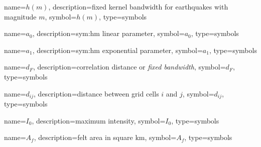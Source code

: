 {
	name={\ensuremath{h(m)}},
	description={fixed kernel bandwidth for earthquakes with magnitude $m$}, 
	symbol={\ensuremath{h(m)}}, 
	type=symbols
}



{
	name={\ensuremath{a_0}},
	description={\gls{sym:hm} linear parameter}, 
	symbol={\ensuremath{a_0}}, 
	type=symbols
}



{
	name={\ensuremath{a_1}},
	description={\gls{sym:hm} exponential parameter}, 
	symbol={\ensuremath{a_1}}, 
	type=symbols
}




{
	name={\ensuremath{d_F}},
	description={correlation distance or \emph{fixed bandwidth}}, 
	symbol={\ensuremath{d_F}}, 
	type=symbols
}


{
	name={\ensuremath{d_{ij}}},
	description={distance between grid cells $i$ and $j$}, 
	symbol={\ensuremath{d_{ij}}}, 
	type=symbols
}


{
	name={\ensuremath{I_0}},
	description={maximum intensity}, 
	symbol={\ensuremath{I_0}}, 
	type=symbols
}


{
	name={\ensuremath{A_{f}}},
	description={felt area in square km}, 
	symbol={\ensuremath{A_{f}}}, 
	type=symbols
}



